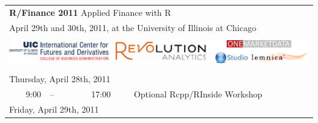 \documentclass[10pt]{article}
\newcommand{\ra}[1]{\renewcommand{\arraystretch}{#1}}  %
\newcommand{\mylinecolor}[1]{\color{#1}\vspace{-8pt}}  %
\begin{document}
\thispagestyle{empty}


\ra{1.1} \sf

\begin{tabular}{rlrlp{5in}} %

  \multicolumn{5}{l}{\Huge \textbf{\color{KeynoteTalk} R/Finance 2011} \huge \phantom{i} Applied Finance with R} \\
  \multicolumn{5}{l}{\large \color{Breaks} April 29th and 30th, 2011, at the University of Illinois at Chicago} \\[3pt]

  \bottomrule \\

  \multicolumn{5}{l}{
    \centering
    \includegraphics[page=1,scale=1.05]{2011Sponsors.pdf}
  } \\[5pt]

  \bottomrule \\[3pt]

  \multicolumn{5}{l}{\large \color{Breaks} Thursday, April 28th, 2011} \\[10pt]
  \color{Breaks} 9:00 & \color{Breaks}-- & \color{Breaks} 17:00 &   & \small{\mylinecolor{Breaks} Optional Rcpp/RInside Workshop} \\[12pt]

  \multicolumn{5}{l}{\large Friday, April 29th, 2011} \\[10pt]


\end{tabular}
\end{document}
